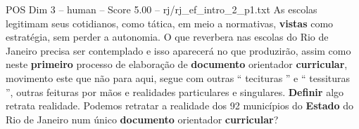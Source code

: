 \begin{textsample}{POS Dim 3 – human – Score 5.00 – rj/rj\_ef\_intro\_2\_p1.txt}  \label{ex:f3_pos_014}
As escolas legitimam seus cotidianos, como tática, em meio a normativas, \textbf{vistas} como estratégia, sem perder a autonomia.
O que reverbera nas escolas do Rio de Janeiro precisa ser contemplado e isso aparecerá no que produzirão, assim como neste \textbf{primeiro} processo de elaboração de \textbf{documento} orientador \textbf{curricular}, movimento este que não para aqui, segue com outras “ tecituras ” e “ tessituras ”, outras feituras por mãos e realidades particulares e singulares. \textbf{Definir} algo retrata realidade.
Podemos retratar a realidade dos 92 municípios do \textbf{Estado} do Rio de Janeiro num único \textbf{documento} orientador \textbf{curricular}?

\end{textsample}

